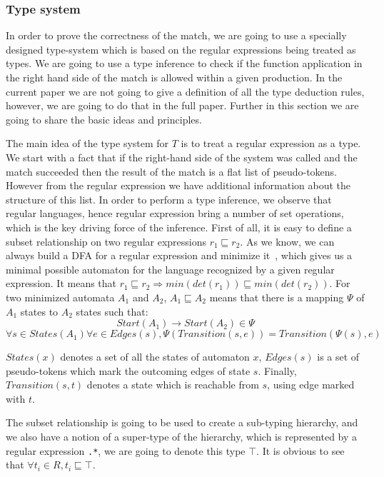 \subsubsection{Type system}
In order to prove the correctness of the match, we are going to use
a specially designed type-system which is based on the regular 
expressions being treated as types.  We are going to use a type
inference to check if the function application in the right hand
side of the match is allowed within a given production.  In the
current paper we are not going to give a definition of all the
type deduction rules, however, we are going to do that in the 
full paper.  Further in this section we are going to share the
basic ideas and principles.

The main idea of the type system for $T$ is to treat a regular
expression as a type.  We start with a fact that if the 
right-hand side of the system was called and the match succeeded
then the result of the match is a flat list of pseudo-tokens.
However from the regular expression we have additional information
about the structure of this list.  In order to perform a type 
inference, we observe that regular languages, hence regular 
expression bring a number of set operations, which is the key
driving force of the inference.  First of all, it is easy to
define a subset relationship on two regular expressions
$r_1 \sqsubseteq r_2$.  As we know, we can always build a DFA for
a regular expression and minimize it~\cite{dragon-book}, which gives us a minimal
possible automaton for the language recognized by a given regular
expression.  It means that $r_1 \sqsubseteq r_2 \Rightarrow 
min (det (r_1)) \sqsubseteq min (det (r_2))$.  For two minimized 
automata $A_1$ and $A_2$, $A_1 \sqsubseteq A_2$ means that there
is a mapping $\Psi$ of $A_1$ states to $A_2$ states such that:
\[
    Start (A_1) \to Start (A_2) \in \Psi
\]
\[
    \forall s \in States (A_1) \forall e \in Edges (s),
    \Psi (Transition (s, e)) = Transition (\Psi (s), e)
\]

$States (x)$ denotes a set of all the states of automaton $x$,
$Edges (s)$ is a set of pseudo-tokens which mark the outcoming
edges of state $s$.  Finally, $Transition (s, t)$ denotes a
state which is reachable from $s$, using edge marked with $t$.

The subset relationship is going to be used to create a sub-typing
hierarchy, and we also have a notion of a super-type of
the hierarchy, which is represented by a regular expression \verb|.*|,
we are going to denote this type $\top$.  It is obvious to see that
$\forall t_i \in R, t_i \sqsubseteq \top$.

